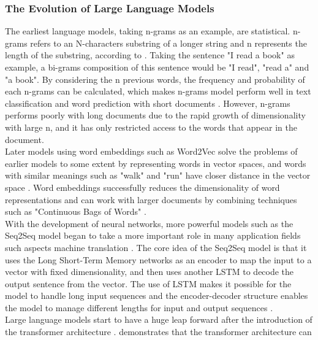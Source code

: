 \documentclass[runningheads]{llncs}
\begin{document}
\subsubsection{The Evolution of Large Language Models}  
\noindent \newline 
The earliest language models, taking n-grams as an example, are statistical. n-grams refers to an N-characters substring of a longer string and n represents the length of the substring, according to \cite{Cavnar94}.
Taking the sentence "I read a book" as example, a bi-grams composition of this sentence would be "I read", "read a" and "a book". By considering the n previous words, the frequency and probability of each
n-grams can be calculated, which makes n-grams model perform well in text classification and word prediction with short documents \cite{Cavnar94}. 
However, n-grams performs poorly with long documents due to the rapid growth of dimensionality with large n, and it has only restricted access to the words that appear in the document.\\
\noindent \newline
Later models using word embeddings such as Word2Vec solve the problems of earlier models to some extent by representing words in vector spaces, and words with similar meanings such as "walk" and "run" have closer distance
in the vector space \cite{Mikolov13}. Word embeddings successfully reduces the dimensionality of word representations and can work with larger documents by combining techniques such as "Continuous Bags of Words" \cite{Mikolov13}. \\   
\noindent \newline
With the development of neural networks, more powerful models such as the Seq2Seq model began to take a more important role in many application fields such aspects
machine translation \cite{Sutskever14}. The core idea of the Seq2Seq model is that it uses the Long Short-Term Memory networks as an encoder to map the input to a vector with fixed dimensionality, and then
uses another LSTM to decode the output sentence from the vector. The use of LSTM makes it possible for the model to handle long input sequences and the encoder-decoder structure enables the model 
to manage different lengths for input and output sequences \cite{Sutskever14}. \\
\noindent \newline
Large language models start to have a huge leap forward after the introduction of the transformer architecture \cite{Vaswani17}. \cite{Radford18} demonstrates that the transformer architecture can
\end{document}
